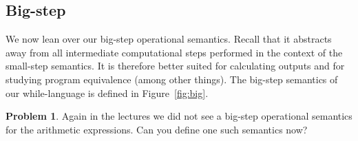 \documentclass[a4paper, 11pt]{article}
\theoremstyle{definition}
\newtheorem{problem}{Problem}
\begin{document}
\subsection{Big-step}

We now lean over our big-step operational semantics. Recall that it abstracts
away from all intermediate computational steps performed in the context of the
small-step semantics. It is therefore better suited  for calculating outputs
and for studying program equivalence (among other things).  The big-step
semantics of our while-language is defined in
Figure~\ref{fig:big}.

\begin{problem}
        Again in the lectures we did not see a big-step operational
        semantics for the arithmetic expressions. Can you define one such
        semantics now?
\end{problem}
\end{document}
